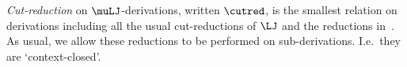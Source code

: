 
\begin{defn}
    \label{def:appl-and-cut-red-muLJ}
\emph{Cut-reduction} on $\muLJ$-derivations, written $\cutred$, is the smallest relation on derivations including all the usual cut-reductions of $\LJ$ and the reductions in~. {As usual, we allow these reductions to be performed on sub-derivations. I.e.\ they are `context-closed'.} 
% 
\end{defn}

